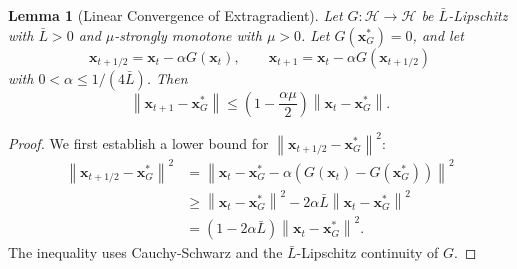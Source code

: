 \documentclass[letterpaper,11pt]{article}
\newcommand{\parenth}[1]{\left( #1 \right)}
\newcommand{\norm}[1]{\left\| #1 \right\|}
\newcommand{\vect}[1]{\mathbf{#1}}
\newtheorem{lemma}{Lemma}
\begin{document}
\begin{lemma}[Linear Convergence of Extragradient]\label{lem:eg-linear-conv}
Let \(G: \mathcal{H} \to \mathcal{H}\) be \(\bar L\)-Lipschitz with \(\bar L>0\) and \(\mu\)-strongly monotone with \(\mu>0\). Let \(G(\vect{x}_G^*)=0\), and let
\[
    \vect{x}_{t+1/2}=\vect{x}_t-\alpha G(\vect{x}_t),
    \qquad
    \vect{x}_{t+1}=\vect{x}_t-\alpha G(\vect{x}_{t+1/2})
\]
with \(0<\alpha\le 1/(4\bar L)\). Then
\[
    \norm{\vect{x}_{t+1} - \vect{x}_G^*}
    \le
    \left(1-\frac{\alpha\mu}{2}\right)
    \norm{\vect{x}_t - \vect{x}_G^*}.
\]
\end{lemma}

\begin{proof}
We first establish a lower bound for $\norm{\vect{x}_{t+1/2} - \vect{x}_G^*}^2$:
\begin{align*}
\norm{\vect{x}_{t+1/2} - \vect{x}_G^*}^2
&= \norm{\vect{x}_t - \vect{x}_G^* - \alpha (G(\vect{x}_t) - G(\vect{x}_G^*))}^2 \\
&\ge \norm{\vect{x}_t - \vect{x}_G^*}^2 - 2\alpha\bar L \norm{\vect{x}_t - \vect{x}_G^*}^2 \\
&= \parenth{1 - 2\alpha\bar L}\norm{\vect{x}_t - \vect{x}_G^*}^2.
\end{align*}
The inequality uses Cauchy-Schwarz and the \(\bar L\)-Lipschitz continuity of \(G\).


\end{proof}
\end{document}
